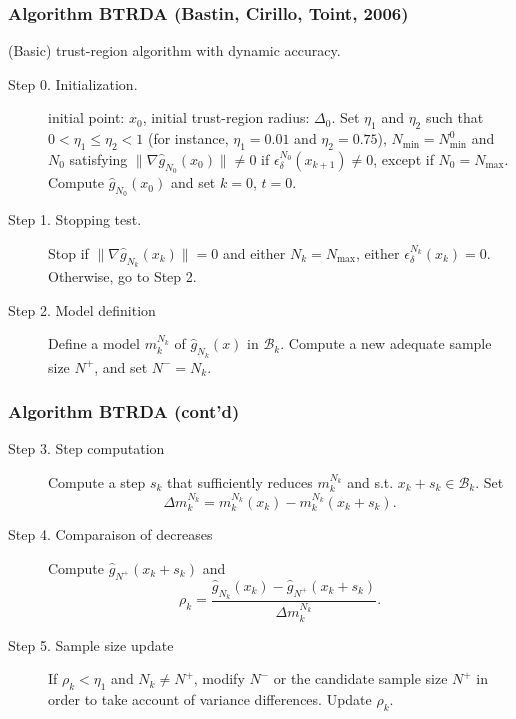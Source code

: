 \documentclass{beamer}
\begin{document}
\begin{frame}
\frametitle{Algorithm BTRDA (Bastin, Cirillo, Toint, 2006)}

(Basic) trust-region algorithm with dynamic accuracy.

\mbox{}

\begin{description}
\item[Step 0. Initialization.]

initial point: $x_0$, initial trust-region radius: $\Delta_0$.
Set $\eta_1$ and $\eta_2$ such that $0 < \eta_1 \leq
\eta_2 < 1$ (for instance, $\eta_1 = 0.01$ and $\eta_2 = 0.75$),
$N_{\min} = N^0_{\min}$ and %
$N_0$ satisfying $\| \nabla \hat{g}_{N_0} (x_0) \| \ne 0$ if $\epsilon_{\delta}^{N_0}(x_{k+1}) \ne
0$, except if $N_0 = N_{\max}$.
Compute $\hat{g}_{N_0}(x_0)$ and set $k = 0$, $t = 0$.
\item[Step 1. Stopping test.]
Stop if $\| \nabla \hat{g}_{N_{k}}(x_{k})\| = 0$ and either
$N_k = N_{\max}$, either $\epsilon_{\delta}^{N_k}(x_k) = 0$.
Otherwise, go to Step 2.
\item[Step 2. Model definition]
Define a model $m_k^{N_k}$ of $\hat{g}_{N_k}(x)$ in $\mathcal{B}_k$.
Compute a new adequate sample size $N^{+}$, and set $N^- = N_k$.
\end{description}

\end{frame}

\begin{frame}
\frametitle{Algorithm BTRDA (cont'd)}

\begin{description}
\item[Step 3. Step computation]
Compute a step $s_k$ that sufficiently reduces $m_k^{N_k}$ and s.t. $x_k + s_k \in \mathcal{B}_k$.
Set
\[ \Delta m_k^{N_k} = m_k^{N_k}(x_k) - m_k^{N_k}(x_k+s_k). \]
\item[Step 4. Comparaison of decreases]
Compute $\hat{g}_{N^+} (x_k + s_k)$ and %
\[
\rho_k = \frac{\hat{g}_{N_k}(x_k) - \hat{g}_{N^+}(x_k+s_k)}
{\Delta m_k^{N_k}}.
\]
\item[Step 5. Sample size update]
If $\rho_k < \eta_1$ and $N_k \ne N^+$, modify $N^-$ or the candidate sample size $N^+$ in order to take account of variance differences.
Update $\rho_k$.
\end{description}

\end{frame}
\end{document}
